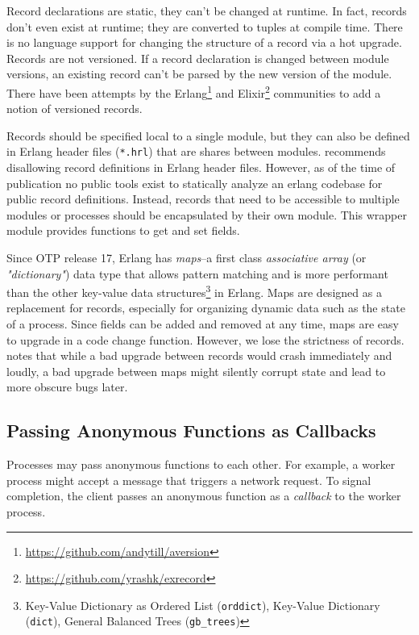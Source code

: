 Record declarations are static, they can't be changed at runtime. In fact, records don't even exist at runtime; they are converted to tuples at compile time. There is no language support for changing the structure of a record via a hot upgrade. Records are not versioned. If a record declaration is changed between module versions, an existing record can't be parsed by the new version of the module. There have been attempts by the Erlang\footnote{\url{https://github.com/andytill/aversion}} and Elixir\footnote{\url{https://github.com/yrashk/exrecord}} communities to add a notion of versioned records.

Records should be specified local to a single module, but they can also be defined in Erlang header files (\lstinline|*.hrl|) that are shares between modules. \cite{davis:talk} recommends disallowing record definitions in Erlang header files. However, as of the time of publication no public tools exist to statically analyze an erlang codebase for public record definitions. Instead, records that need to be accessible to multiple modules or processes should be encapsulated by their own module. This wrapper module provides functions to get and set fields.

Since OTP release 17, Erlang has \emph{maps}--a first class \emph{associative array} (or \emph{"dictionary"}) data type that allows pattern matching and is more performant than the other key-value data structures\footnote{Key-Value Dictionary as Ordered List (\lstinline|orddict|), Key-Value Dictionary (\lstinline|dict|), General Balanced Trees (\lstinline|gb_trees|)} in Erlang. Maps are designed as a replacement for records, especially for organizing dynamic data such as the state of a process. Since fields can be added and removed at any time, maps are easy to upgrade in a code change function. However, we lose the strictness of records. \cite{ferd} notes that while a bad upgrade between records would crash immediately and loudly, a bad upgrade between maps might silently corrupt state and lead to more obscure bugs later.


\subsection{Passing Anonymous Functions as Callbacks}

Processes may pass anonymous functions to each other. For example, a worker process might accept a message that triggers a network request. To signal completion, the client passes an anonymous function as a \emph{callback} to the worker process.


